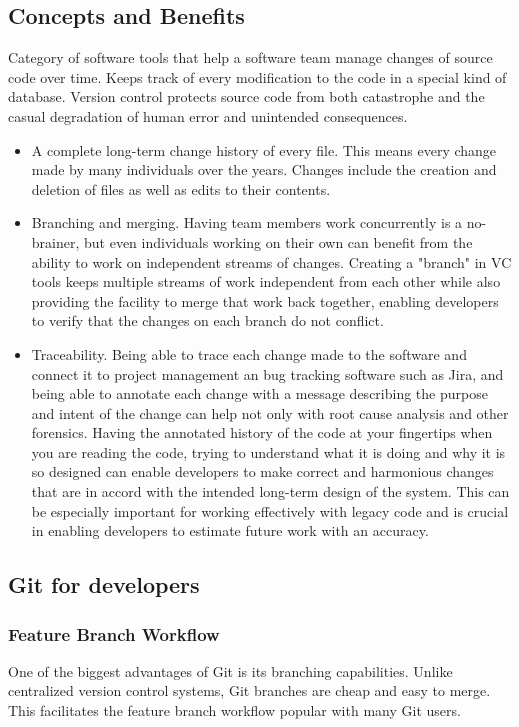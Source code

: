 \documentclass[11pt]{article}
\begin{document}
\subsection{Concepts and Benefits}
\label{sec:org31b1b2c}
Category of software tools that help a software team manage changes of source code over time. Keeps track of every modification to the code in a special kind of database. Version control protects source code from both catastrophe and the casual degradation of human error and unintended consequences.
\begin{itemize}
\item A complete long-term change history of every file. This means every change made by many individuals over the years. Changes include the creation and deletion of files as well as edits to their contents.
\item Branching and merging. Having team members work concurrently is a no-brainer, but even individuals working on their own can benefit from the ability to work on independent streams of changes. Creating a "branch" in VC tools keeps multiple streams of work independent from each other while also providing the facility to merge that work back together, enabling developers to verify that the changes on each branch do not conflict.
\item Traceability. Being able to trace each change made to the software and connect it to project management an bug tracking software such as Jira, and being able to annotate each change with a message describing the purpose and intent of the change can help not only with root cause analysis and other forensics. Having the annotated history of the code at your fingertips when you are reading the code, trying to understand what it is doing and why it is so designed can enable developers to make correct and harmonious changes that are in accord with the intended long-term design of the system. This can be especially important for working effectively with legacy code and is crucial in enabling developers to estimate future work with an accuracy.
\end{itemize}
\subsection{Git for developers}
\label{sec:orgaae69ce}
\subsubsection{Feature Branch Workflow}
\label{sec:org3a5f72d}
One of the biggest advantages of Git is its branching capabilities. Unlike centralized version control systems, Git branches are cheap and easy to merge. This facilitates the feature branch workflow popular with many Git users.
\end{document}
